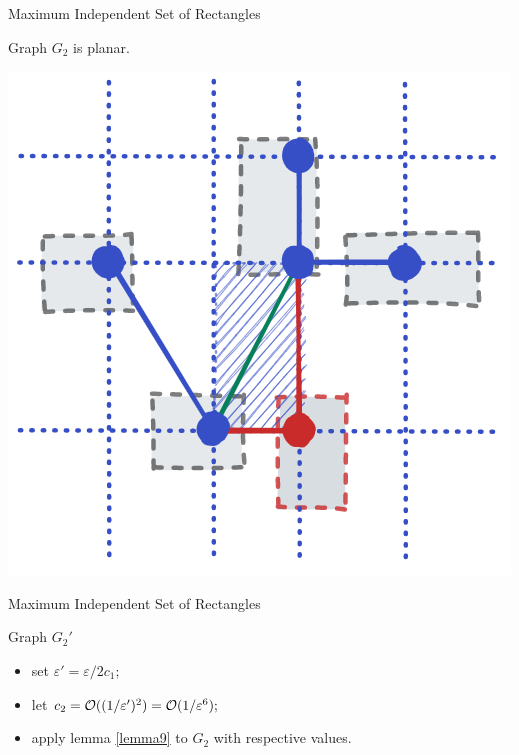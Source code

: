 \documentclass[handout,usenames,dvipsnames]{beamer}
\begin{document}
\begin{frame}{Maximum Independent Set of Rectangles}
    \begin{minipage}{0.45\textwidth}
    \begin{lm}
        Graph $G_2$ is planar.
    \end{lm}
    \end{minipage}\hfill
    \begin{minipage}{0.45\textwidth}
    \includegraphics[width=\textwidth]{g22.png}
    \end{minipage}
\end{frame}

\begin{frame}{Maximum Independent Set of Rectangles}
    \begin{block}{Graph $G_2'$}
    \begin{itemize}
        \item set $\varepsilon' = \varepsilon/2c_1;$
        \pause
        \item let $c_2 = \mathcal{O}((1/\varepsilon')^2) = \mathcal{O}(1/\varepsilon^6);$
        \pause
        \item apply lemma \ref{lemma9} to $G_2$ with respective values.
    \end{itemize}
    \end{block}
\end{frame}
\end{document}
